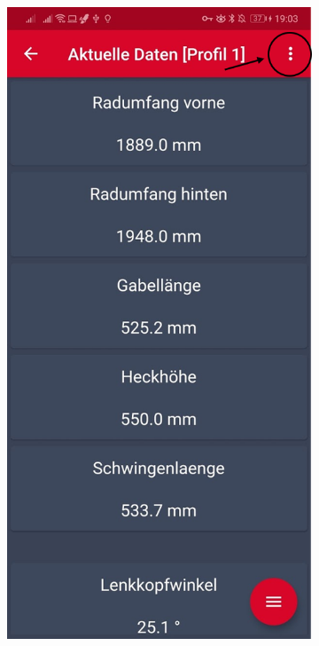 \begin{figure}[H]
\begin{subfigure}[b]{0.3\textwidth}
	\end{subfigure}
	\hfill
	\begin{subfigure}[b]{0.3\textwidth}
		\includegraphics[width=1\textwidth]{../include/images/settings/Open_Settings_02}

\end{subfigure}
\end{figure}
